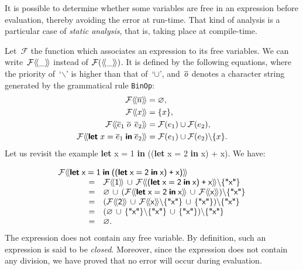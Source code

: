 It is possible to determine whether some variables are free in an
expression before evaluation, thereby avoiding the error 
at run\hyp{}time. That kind of analysis is a particular case of
\emph{static analysis}, that is, taking place at compile\hyp{}time.

Let~$\mathcal{F}$ the function which associates an expression to its
free variables. We can write~$\mathcal{F} \langle\!\langle{\_}\rangle\!\rangle$ instead of
$\mathcal{F}(\langle\!\langle{\_}\rangle\!\rangle)$. It is defined by the following equations,
where the priority of~`$\backslash$' is higher than that of~`$\cup$',
and~$\overline{o}$ denotes a character string generated by the grammatical
rule \texttt{BinOp}:
\begin{align*}
\mathcal{F} \src{\meta{n}} & = \varnothing,\\
\mathcal{F} \src{x} & = \{x\},\\
\mathcal{F} \src{\meta{e}_1 \; \meta{o} \;\, \meta{e}_2} & = \mathcal{F}(e_1) \cup \mathcal{F}(e_2),\\
\mathcal{F} \src{\Xlet \; x \; \equal \; \meta{e}_1 \; \Xin \;
  \meta{e}_2} & = \mathcal{F}(e_1) \cup \mathcal{F}(e_2) \backslash \{x\}.
\end{align*}
Let us revisit the example \textsf{\textbf{let} x = 1 \textbf{in}
  ((\textbf{let} x = 2 \textbf{in} x) + x)}. We have:

\begin{equation*}
\begin{array}{lcl}
\multicolumn{3}{l}{
\mathcal{F} \src{\Xlet \; \ident{x} \; \equal \; \num{1} \; \Xin \;
  \lpar\lpar\Xlet \; \ident{x} \; \equal \; \num{2} \; \Xin \;
  \ident{x}\rpar{} \; \texttt{+} \; \ident{x}\rpar}}\\
\phantom{XXX}
 &=& \mathcal{F} \src{\num{1}} \, \cup \, \mathcal{F} \src{\lpar\Xlet \; \ident{x} \;
     \equal \; \num{2} \; \Xin \; \ident{x}\rpar{} \; \texttt{+}
    \; \ident{x}} \backslash \{\str{x}\}\\ 
 &=& \varnothing \, \cup \,
     (\mathcal{F} \src{\Xlet \; \ident{x} \; \equal \; \num{2} \;
     \Xin \; \ident{x}} \, \cup \, \mathcal{F} \src{\ident{x}})
     \backslash \{\str{x}\} \\
 &=& (\mathcal{F} \src{\num{2}} \, \cup \, \mathcal{F} \src{\ident{x}} \backslash
      \{\str{x}\} \, \cup \, \{\str{x}\}) \backslash \{\str{x}\}\\
 &=& (\varnothing \, \cup \, \{\str{x}\} \backslash \{\str{x}\}
     \, \cup \, \{\str{x}\}) \backslash \{\str{x}\}\\
 &=& \varnothing.
\end{array}
\end{equation*}
The expression does not contain any free variable. By definition, such
an expression is said to be \emph{closed}. Moreover, since the
expression does not contain any division, we have proved that 
no error will occur during evaluation.

